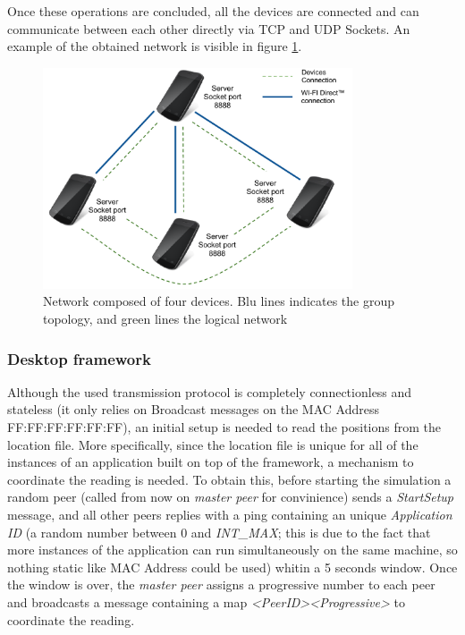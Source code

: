 Once these operations are concluded, all the devices are connected and can communicate between each other directly via TCP and UDP Sockets. An example of the obtained network is visible in figure \ref{fig:device_network}.

\begin{figure}[!htbp]
\centering
\includegraphics[width=3.6in]{imgs/Devices_network.pdf}
\caption{Network composed of four devices. Blu lines indicates the \direct group topology, and green lines the logical network}
\label{fig:device_network}
\end{figure}

\subsubsection{Desktop framework}
Although the used transmission protocol is completely connectionless and stateless (it only relies on Broadcast messages on the MAC Address FF:FF:FF:FF:FF:FF), an initial setup is needed to read the positions from the location file. More specifically, since the location file is unique for all of the instances of an application built on top of the framework, a mechanism to coordinate the reading is needed. To obtain this, before starting the simulation a random peer (called from now on \textit{master peer} for convinience) sends a \textit{StartSetup} message, and all other peers replies with a ping containing an unique \textit{Application ID} (a random number between 0 and \textit{INT\_MAX}; this is due to the fact that more instances of the application can run simultaneously on  the same machine, so nothing static like MAC Address could be used) whitin a 5 seconds window. Once the window is over, the \textit{master peer} assigns a progressive number to each peer and broadcasts a message containing a map \textit{\textless PeerID\textgreater\textless Progressive\textgreater} to coordinate the reading.
